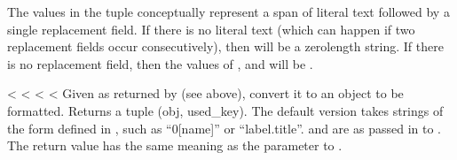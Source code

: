 \documentclass[letterpaper,10pt,english]{sphinxmanual}
\begin{document}
\begin{fulllineitems}
\begin{fulllineitems}
The values in the tuple conceptually represent a span of literal text
followed by a single replacement field.  If there is no literal text
(which can happen if two replacement fields occur consecutively), then
 will be a zero\sphinxhyphen{}length string.  If there is no replacement
field, then the values of ,  and 
will be .

\end{fulllineitems}


\vspace{5px}

\begin{fulllineitems}
\label{\detokenize{string:string.Formatter.get_field}}
<%
\pysigstartsignatures
<%
<%
<%
Given  as returned by {\hyperref[\detokenize{string:string.Formatter.parse}]{}} (see above), convert it to
an object to be formatted.  Returns a tuple (obj, used\_key).  The default
version takes strings of the form defined in , such as
“0{[}name{]}” or “label.title”.   and  are as passed in to
{\hyperref[\detokenize{string:string.Formatter.vformat}]{}}.  The return value  has the same meaning as the
 parameter to {\hyperref[\detokenize{string:string.Formatter.get_value}]{}}.

\end{fulllineitems}



\end{fulllineitems}
\end{document}
